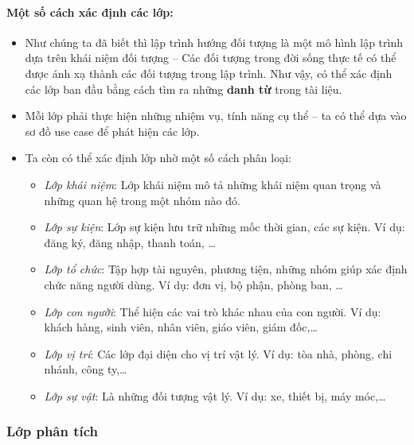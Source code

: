 \documentclass{article}
\begin{document}
      \paragraph{\textnormal{
        Một số cách xác định các lớp:
      }}
      \begin{itemize}
        \item Như chúng ta đã biết thì lập trình hướng đối tượng là một mô hình lập trình dựa trên khái niệm đối tượng -- Các đối tượng trong đời sống thực tế có thể được ánh xạ thành các đối tượng trong lập trình. Như vậy, có thể xác định các lớp ban đầu bằng cách tìm ra những \textbf{danh từ} trong tài liệu.
        \item Mỗi lớp phải thực hiện những nhiệm vụ, tính năng cụ thể -- ta có thể dựa vào sơ đồ use case để phát hiện các lớp.
        \item Ta còn có thể xác định lớp nhờ một số cách phân loại:
        \begin{itemize}
          \item \textit{Lớp khái niệm}: Lớp khái niệm mô tả những khái niệm quan trọng và những quan hệ trong một nhóm nào đó.
          \item \textit{Lớp sự kiện}: Lớp sự kiện lưu trữ những mốc thời gian, các sự kiện. Ví dụ: đăng ký, đăng nhập, thanh toán, \ldots
          \item \textit{Lớp tổ chức}: Tập hợp tài nguyên, phương tiện, những nhóm giúp xác định chức năng người dùng. Ví dụ: đơn vị, bộ phận, phòng ban, \ldots
          \item \textit{Lớp con người}: Thể hiện các vai trò khác nhau của con người. Ví dụ: khách hàng, sinh viên, nhân viên, giáo viên, giám đốc,\ldots
          \item \textit{Lớp vị trí}: Các lớp đại diện cho vị trí vật lý. Ví dụ: tòa nhà, phòng, chi nhánh, công ty,\ldots
          \item \textit{Lớp sự vật}: Là những đối tượng vật lý. Ví dụ: xe, thiết bị, máy móc,\ldots
        \end{itemize}
      \end{itemize}
    
    \subsubsection{Lớp phân tích}
\end{document}
